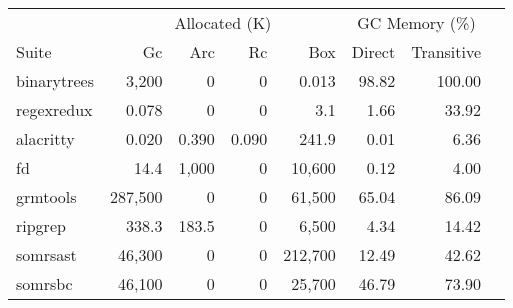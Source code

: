 \begin{tabular}{lrrrrrrr}
\toprule
& \multicolumn{4}{c}{Allocated (K)} & \multicolumn{2}{c}{GC Memory (\%)} \\
\cmidrule(lr){2-5} \cmidrule(lr){6-7} 
Suite & Gc & Arc & Rc & Box & Direct & Transitive \\
\midrule
binarytrees & 3,200 & 0 & 0 & 0.013 & 98.82 & 100.00 \\
regexredux & 0.078 & 0 & 0 & 3.1 & 1.66 & 33.92 \\
\midrule
alacritty & 0.020 & 0.390 & 0.090 & 241.9 & 0.01 & 6.36 \\
fd & 14.4 & 1,000 & 0 & 10,600 & 0.12 & 4.00 \\
grmtools & 287,500 & 0 & 0 & 61,500 & 65.04 & 86.09 \\
ripgrep & 338.3 & 183.5 & 0 & 6,500 & 4.34 & 14.42 \\
somrsast & 46,300 & 0 & 0 & 212,700 & 12.49 & 42.62 \\
somrsbc & 46,100 & 0 & 0 & 25,700 & 46.79 & 73.90 \\
\bottomrule
\end{tabular}

